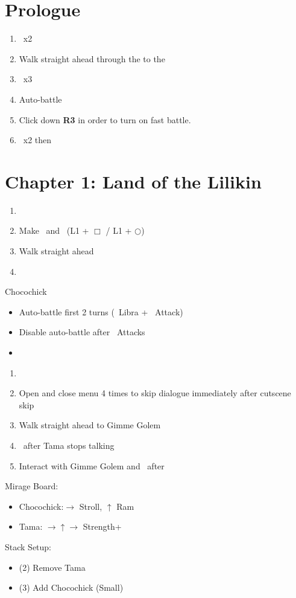 \chapter{Prologue}
\begin{enumerate}
	\item \cs\ x2
	\item Walk straight ahead through the  to the 
	\item \cs\ x3
	\item Auto-battle
	\item Click down \textbf{R3} in order to turn on fast battle.
	\item \cs\ x2 then
\end{enumerate}
\chapter{Chapter 1: Land of the Lilikin}
\begin{enumerate}
	\item \cs%
	\item Make \lann\ and \reynn\ \bigc (L1 + $\Box$ / L1 + $\bigcirc$)
	\item Walk straight ahead
	\item \cs%
\end{enumerate}
\begin{battle}[]{Chocochick}
	\begin{itemize}
		\item Auto-battle first 2 turns (\lann\ Libra + \reynn\ Attack)
		\item Disable auto-battle after \reynn\ Attacks
		\item \imprism\
	\end{itemize}
\end{battle}
\begin{enumerate}[resume]
	\item \cs%
	\item Open and close menu 4 times to skip dialogue immediately after cutscene skip
	\item Walk straight ahead to Gimme Golem
	\item \cs\ after Tama stops talking
	\item Interact with Gimme Golem and \cs\ after
\end{enumerate}
\begin{menu}
	Mirage Board:
	\begin{itemize}
		\item Chocochick:$\rightarrow$ Stroll, $\uparrow$ Ram
		\item Tama: $\rightarrow\uparrow\rightarrow$ Strength+
	\end{itemize}
	Stack Setup:
	\begin{itemize}
		\item (2) Remove Tama
		\item (3) Add Chocochick (Small)
	\end{itemize}
\end{menu}
